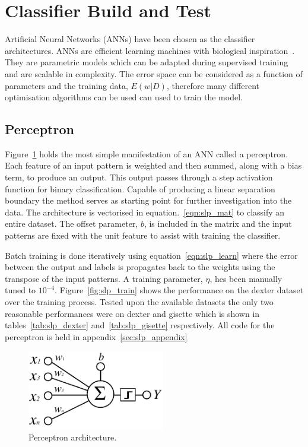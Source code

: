 \documentclass{ecsarticle}     %
\begin{document}
\section{Classifier Build and Test}

Artificial Neural Networks (ANNs) have been chosen as the classifier architectures.
ANNs are efficient learning machines with biological inspiration~\citep{bishop06pattern}. 
They are parametric models which can be adapted during supervised training and are scalable in complexity.
The error space can be considered as a function of parameters and the training data, $E(w|D)$, therefore many different optimisation algorithms can be used can used to train the model. 



\subsection{Perceptron}
\label{sec:perceptron}

Figure~\ref{fig:slp} holds the most simple manifestation of an ANN called a perceptron.
Each feature of an input pattern is weighted and then summed, along with a bias term, to produce an output.
This output passes through a step activation function for binary classification.
Capable of producing a linear separation boundary the method serves as starting point for further investigation into the data.
The architecture is vectorised in equation.~\eqref{eqn:slp_mat} to classify an entire dataset. 
The offset parameter, $b$, is included in the matrix and the input patterns are fixed with the unit feature to assist with training the classifier. 

Batch training is done iteratively using equation~\eqref{eqn:slp_learn} where the error between the output and labels is propagates back to the weights using the transpose of the input patterns.
A training parameter, $\eta$, hes been manually tuned to $10^{-4}$.
Figure~\ref{fig:slp_train} shows the performance on the dexter dataset over the training process.
Tested upon the available datasets the only two reasonable performances were on dexter and gisette which is shown in tables~\ref{tab:slp_dexter} and~\ref{tab:slp_gisette} respectively.
All code for the perceptron is held in appendix~\ref{sec:slp_appendix}

\begin{figure}[ht]
   \centering
    \includegraphics[width = 6cm]{SLP.pdf}
   \caption{Perceptron architecture.}
   \label{fig:slp}
\end{figure}
\end{document}
